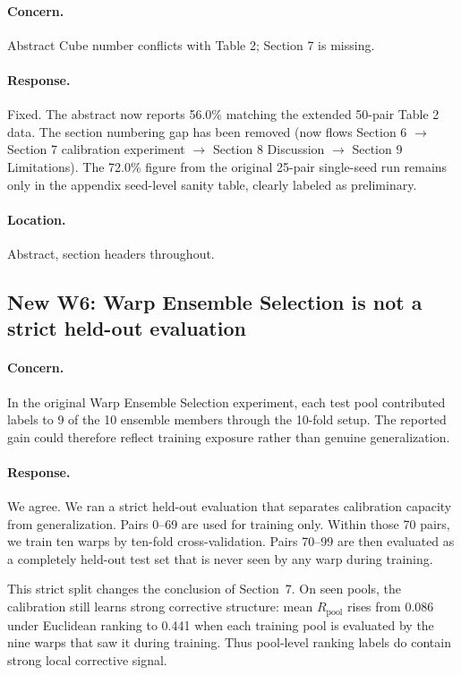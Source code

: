 \documentclass[11pt]{article}
\newcommand{\Rpool}{R_{\mathrm{pool}}}
\begin{document}
\paragraph{Concern.}
Abstract Cube number conflicts with Table 2; Section 7 is missing.

\paragraph{Response.}
Fixed. The abstract now reports 56.0\% matching the extended 50-pair Table 2 data. The section numbering gap has been removed (now flows Section 6 $\rightarrow$ Section 7 calibration experiment $\rightarrow$ Section 8 Discussion $\rightarrow$ Section 9 Limitations). The 72.0\% figure from the original 25-pair single-seed run remains only in the appendix seed-level sanity table, clearly labeled as preliminary.

\paragraph{Location.}
Abstract, section headers throughout.

\subsection*{New W6: Warp Ensemble Selection is not a strict held-out evaluation}

\paragraph{Concern.}
In the original Warp Ensemble Selection experiment, each test pool contributed labels to 9 of the 10 ensemble members through the 10-fold setup. The reported gain could therefore reflect training exposure rather than genuine generalization.

\paragraph{Response.}
We agree. We ran a strict held-out evaluation that separates calibration capacity from generalization. Pairs 0--69 are used for training only. Within those 70 pairs, we train ten warps by ten-fold cross-validation. Pairs 70--99 are then evaluated as a completely held-out test set that is never seen by any warp during training.

This strict split changes the conclusion of Section~7. On seen pools, the calibration still learns strong corrective structure: mean $\Rpool$ rises from 0.086 under Euclidean ranking to 0.441 when each training pool is evaluated by the nine warps that saw it during training. Thus pool-level ranking labels do contain strong local corrective signal.
\end{document}
